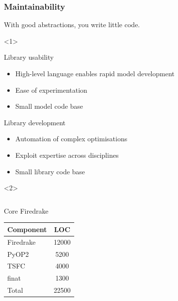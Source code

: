 \documentclass[presentation]{beamer}
\begin{document}
\begin{frame}
  \frametitle{Maintainability}
  With good abstractions, you write little code.
  \begin{overlayarea}{\textwidth}{0.8\textheight}
    \begin{onlyenv}<1>
      \begin{block}{Library usability}
        \begin{itemize}
        \item High-level language enables rapid model development
        \item Ease of experimentation
        \item Small model code base
        \end{itemize}
      \end{block}

      \begin{block}{Library development}
        \begin{itemize}
        \item Automation of complex optimisations
        \item Exploit expertise across disciplines
        \item Small library code base
        \end{itemize}
      \end{block}
    \end{onlyenv}
    \begin{onlyenv}<2>
  \begin{columns}
    \begin{column}[t]{0.5\textwidth}
      \begin{block}{Core Firedrake}
        \begin{table}
          \centering
          \begin{tabular}{lc}
            Component & LOC   \\
            \hline
            Firedrake & 12000 \\
            PyOP2     & 5200  \\
            TSFC      & 4000  \\
            finat     & 1300   \\
            \hline
            Total     & 22500
          \end{tabular}
        \end{table}
      \end{block}
    \end{column}
    \begin{column}[t]{0.5\textwidth}

\end{column}
\end{columns}
\end{onlyenv}
\end{overlayarea}
\end{frame}
\end{document}
